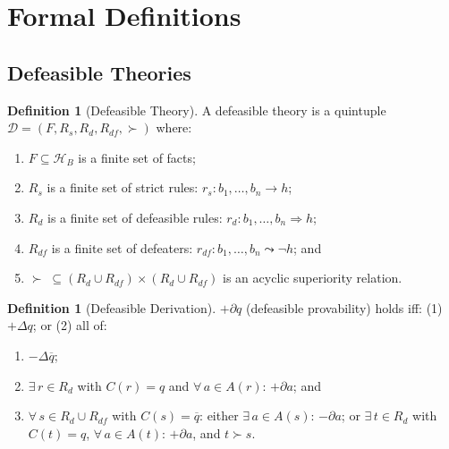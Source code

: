 \documentclass{article}
\theoremstyle{definition}
\newtheorem{definition}[theorem]{Definition}
\newcommand{\D}{\mathcal{D}}
\newcommand{\HB}{\mathcal{H}_B}
\newcommand{\Rs}{R_s}
\newcommand{\Rd}{R_d}
\newcommand{\Rdf}{R_{df}}
\newcommand{\defto}{\Rightarrow}
\newcommand{\strictto}{\rightarrow}
\newcommand{\defeatto}{\leadsto}
\newcommand{\comp}[1]{\overline{#1}}
\begin{document}

\appendix


\section{Formal Definitions}\label{app:definitions}

\subsection{Defeasible Theories}

\begin{definition}[Defeasible Theory]\label{def:deftheory}
A defeasible theory is a quintuple $\D = (F, \Rs, \Rd, \Rdf, {\succ})$ where:
\begin{enumerate}[label=(\roman*)]
    \item $F \subseteq \HB$ is a finite set of facts;
    \item $\Rs$ is a finite set of strict rules: $r_s\colon b_1, \ldots, b_n \strictto h$;
    \item $\Rd$ is a finite set of defeasible rules: $r_d\colon b_1, \ldots, b_n \defto h$;
    \item $\Rdf$ is a finite set of defeaters: $r_{df}\colon b_1, \ldots, b_n \defeatto \neg h$; and
    \item ${\succ} \;\subseteq (\Rd \cup \Rdf) \times (\Rd \cup \Rdf)$ is an acyclic superiority relation.
\end{enumerate}
\end{definition}

\begin{definition}[Defeasible Derivation]\label{def:defderiv}
$+\partial q$ (defeasible provability) holds iff: (1) $+\Delta q$; or (2) all of:
\begin{enumerate}[label=(\alph*)]
    \item $-\Delta \comp{q}$;
    \item $\exists\, r \in \Rd$ with $C(r) = q$ and $\forall\, a \in A(r)$: $+\partial a$; and
    \item $\forall\, s \in \Rd \cup \Rdf$ with $C(s) = \comp{q}$: either $\exists\, a \in A(s)$: $-\partial a$; or $\exists\, t \in \Rd$ with $C(t) = q$, $\forall\, a \in A(t)$: $+\partial a$, and $t \succ s$.
\end{enumerate}
\end{definition}
\end{document}
